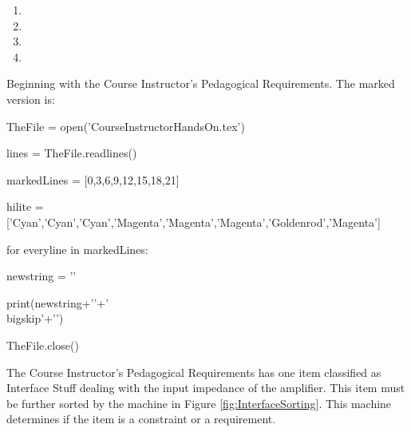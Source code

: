 \begin{enumerate}
	\item {}
	\item {}
	\item {}
	\item {}
\end{enumerate}

\begin{slshape}
\color{blue}
Beginning with the Course Instructor's Pedagogical Requirements.  The marked version is:
\end{slshape}
\bigskip

\begin{python}
TheFile = open('CourseInstructorHandsOn.tex')

lines = TheFile.readlines()

markedLines = [0,3,6,9,12,15,18,21]

hilite = ['Cyan','Cyan','Cyan','Magenta','Magenta','Magenta','Goldenrod','Magenta']

for everyline in markedLines:

    newstring = ''

    print(newstring+'\n'+'\\bigskip'+'\n')

TheFile.close()
\end{python}

\begin{slshape}
\color{blue}

The Course Instructor's Pedagogical Requirements has one item classified as Interface Stuff dealing with the input impedance of the amplifier.  This item must be further sorted by the machine in Figure \ref{fig:InterfaceSorting}.  This machine determines if the item is a constraint or a requirement.

\end{slshape}

